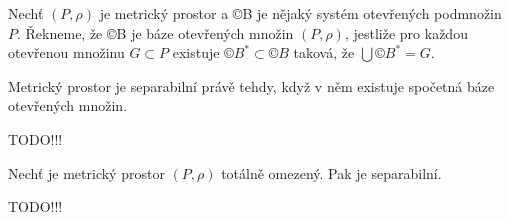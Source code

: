 \documentclass[12pt]{article}					%
\begin{document}
	\begin{definice}
		Nechť $(P, \rho)$ je metrický prostor a ©B je nějaký systém otevřených podmnožin $P$. Řekneme, že ©B je báze otevřených množin $(P, \rho)$, jestliže pro každou otevřenou množinu $G \subset P$ existuje $©B^* \subset ©B$ taková, že $\bigcup ©B^* = G$.
	\end{definice}

	\begin{veta}
		Metrický prostor je separabilní právě tehdy, když v něm existuje spočetná báze otevřených množin.

		\begin{dukazin}
			TODO!!!
		\end{dukazin}
	\end{veta}

	\begin{veta}
		Nechť je metrický prostor $(P, \rho)$ totálně omezený. Pak je separabilní.

		\begin{dukazin}
			TODO!!!
		\end{dukazin}
	\end{veta}
\end{document}
